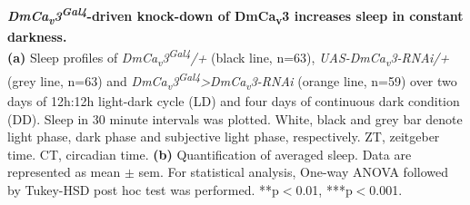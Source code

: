 \label{fig:S3}
\textbf{\emph{DmCa\textsubscript{v}3\textsuperscript{Gal4}}-driven knock-down of DmCa\textsubscript{v}3 increases sleep in constant darkness.}
\\
\textbf{(a)} Sleep profiles of \emph{DmCa\textsubscript{v}3\textsuperscript{Gal4}/+} (black line, n=63), \emph{UAS-DmCa\textsubscript{v}3-RNAi/+} (grey line, n=63) and \emph{DmCa\textsubscript{v}3\textsuperscript{Gal4}\textgreater{}DmCa\textsubscript{v}3-RNAi} (orange line, n=59) over two days of 12h:12h light-dark cycle (LD) and four days of continuous dark condition (DD).
Sleep in 30 minute intervals was plotted.
White, black and grey bar denote light phase, dark phase and subjective light phase, respectively.
ZT, zeitgeber time.
CT, circadian time.
\textbf{(b)} Quantification of averaged sleep.
Data are represented as mean $\pm$ sem.
For statistical analysis, One-way ANOVA followed by Tukey-HSD post hoc test was performed.
**p$<$0.01, ***p$<$0.001.
  
  
  
  
  